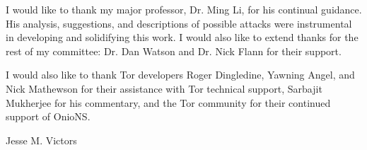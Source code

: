 

%
%

\begin{acknowledgments}

I would like to thank my major professor, Dr. Ming Li, for his continual guidance. His analysis, suggestions, and descriptions of possible attacks were instrumental in developing and solidifying this work. I would also like to extend thanks for the rest of my committee: Dr. Dan Watson and Dr. Nick Flann for their support. 

I would also like to thank Tor developers Roger Dingledine, Yawning Angel, and Nick Mathewson for their assistance with Tor technical support, Sarbajit Mukherjee for his commentary, and the Tor community for their continued support of OnioNS.

\hfill Jesse M. Victors

\end{acknowledgments}

